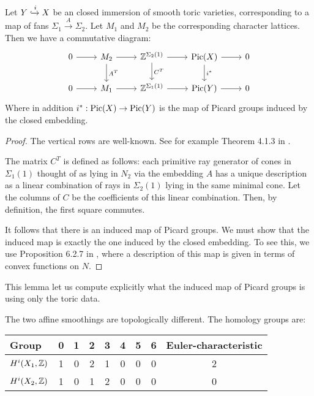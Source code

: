 \begin{lemma}
Let $Y \xhookrightarrow{i} X$ be an closed immersion of smooth toric varieties, corresponding to a map of fans $\Sigma_1 \xrightarrow{A} \Sigma_2$. Let $M_1$ and $M_2$ be the corresponding character lattices. Then we have a commutative diagram:
\[
\begin{tikzcd}
0 \arrow{r} &  M_2 \arrow{r}{} \arrow{d}{A^T} & \Z^{\Sigma_2(1)} \arrow{d}{C^T} \arrow{r} & \Pic(X)  \arrow{d}{i^\ast} \arrow{r} & 0\\
0 \arrow{r} &  M_1 \arrow{r}{} & \Z^{\Sigma_1(1)} \arrow{r} & \Pic(Y) \arrow{r} & 0
\end{tikzcd}
\]
Where in addition $i^\ast : \operatorname{Pic}(X) \to \operatorname{Pic}(Y)$ is the map of Picard groups induced by the closed embedding.
\end{lemma}
\begin{proof}
The vertical rows are well-known. See for example Theorem 4.1.3 in \cite{cox_toric}.

The matrix $C^T$ is defined as follows: each primitive ray generator of cones in $\Sigma_1(1)$ thought of as lying in $N_2$ via the embedding $A$ has a unique description as a linear combination of rays in $\Sigma_2(1)$ lying in the same minimal cone. Let the columns of $C$ be the coefficients of this linear combination. Then, by definition, the first square commutes.

It follows that there is an induced map of Picard groups. We must show that the induced map is exactly the one induced by the closed embedding. To see this, we use Proposition 6.2.7 in \cite{cox_toric}, where a description of this map is given in terms of convex functions on $N$.
\end{proof}

This lemma let us compute explicitly what the induced map of Picard groups is using only the toric data.


\begin{theorem}
The two affine smoothings are topologically different. The homology groups are:
\begin{center}
\begin{tabular}{ l || c | c | c | c | c | c | c || c }
 Group & 0 & 1 & 2 & 3 & 4 & 5 & 6 & Euler-characteristic \\
\hline
$H^i(X_1,\mathbb{Z})$ & 1 & 0 & 2 & 1 & 0 & 0 & 0 & 2 \\
$H^i(X_2,\mathbb{Z})$ & 1 & 0 & 1 & 2 & 0 & 0 & 0  & 0
\end{tabular}
\end{center}
\end{theorem}

